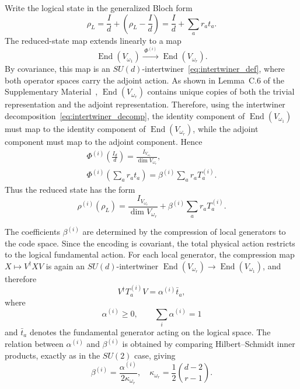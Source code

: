 \documentclass[10pt,twocolumn,superscriptaddress,aps,amsmath,amssymb,citeautoscript,floatfix,prx,longbibliography]{revtex4-2}
\theoremstyle{plain}
\theoremstyle{plain}
\theoremstyle{plain}
\theoremstyle{plain}
\theoremstyle{plain}
\theoremstyle{plain}
\begin{document}
Write the logical state in the generalized Bloch form
\begin{equation}\label{eq:general_bloch}
    \rho_L
    =
    \frac{I}{d}
    +
    \left(\rho_L-\frac{I}{d}\right)
    =
    \frac{I}{d}
    +
    \sum_a r_a t_a .
\end{equation}
The reduced-state map extends linearly to a map
$$
    \operatorname{End}(V_{\omega_1})
    \xrightarrow{\;\Phi^{(i)}\;}
    \operatorname{End}(V_{\omega_r}) .
$$
By covariance, this map is an $SU(d)$-intertwiner~\eqref{eq:intertwiner_def}, where both operator spaces carry the adjoint action. As shown in Lemma~C.6 of the Supplementary Material~\cite{SuppMat}, $\operatorname{End}(V_{\omega_r})$ contains unique copies of both the trivial representation and the adjoint representation. Therefore, using the intertwiner decomposition~\eqref{eq:intertwiner_decomp}, the identity component of $\operatorname{End}(V_{\omega_1})$ must map to the identity component of $\operatorname{End}(V_{\omega_r})$, while the adjoint component must map to the adjoint component. Hence
\begin{equation}\label{eq:linear_ext_of_red_state}
\begin{gathered}
    \Phi^{(i)}\left(\frac{I_d}{d}\right)
    =
    \frac{I_{V_{\omega_r}}}{\dim V_{\omega_r}},
    \\
    \Phi^{(i)}\left(\sum_a r_a t_a\right)
    =
    \beta^{(i)}
    \sum_a r_a T_a^{(i)} .
\end{gathered}
\end{equation}
Thus the reduced state has the form
\begin{equation}\label{eq:reduced_state_sud}
    \rho^{(i)}(\rho_L)
    =
    \frac{I_{V_{\omega_r}}}{\dim V_{\omega_r}}
    +
    \beta^{(i)}
    \sum_a r_a T_a^{(i)}.
\end{equation}

The coefficients $\beta^{(i)}$ are determined by the compression of local generators to the code space. Since the encoding is covariant, the total physical action restricts to the logical fundamental action. For each local generator, the compression map $X\mapsto V^\dagger X V$ is again an $SU(d)$-intertwiner $\operatorname{End}(V_{\omega_r})\rightarrow \operatorname{End}(V_{\omega_1})$, and therefore
$$
    V^\dagger T_a^{(i)}V
    =
    \alpha^{(i)}\bar t_a ,
$$
where 
$$
\alpha^{(i)}\ge 0, \qquad \sum_i\alpha^{(i)}=1
$$
and $\bar t_a$ denotes the fundamental generator acting on the logical space. The relation between $\alpha^{(i)}$ and $\beta^{(i)}$ is obtained by comparing Hilbert--Schmidt inner products, exactly as in the $SU(2)$ case, giving 
$$
\beta^{(i)}=\frac{\alpha^{(i)}}{2\kappa_{\omega_r}}, \quad \kappa_{\omega_r}= \frac12\binom{d-2}{r-1}.
$$
\end{document}
